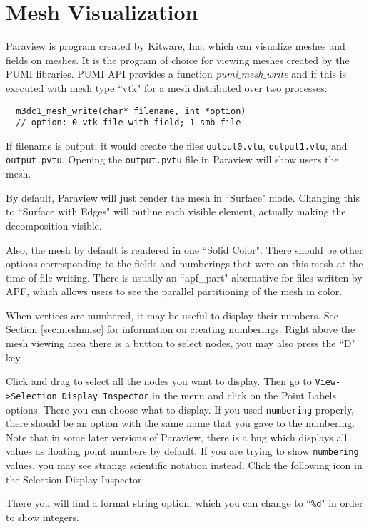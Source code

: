 
\section{Mesh Visualization}
\label{ch:app-paraview}

Paraview is program created by Kitware, Inc. which can visualize meshes
and fields on meshes.
It is the program of choice for viewing meshes created by the PUMI libraries.
PUMI API provides a function \emph{pumi$\_$mesh$\_$write} and if this is executed with mesh type ``vtk" for a mesh distributed over two processes:

\begin{verbatim}
  m3dc1_mesh_write(char* filename, int *option)
  // option: 0 vtk file with field; 1 smb file
\end{verbatim}\vspace{-.5cm}\hspace{1cm}

If filename is output, it would create the files \texttt{output0.vtu}, \texttt{output1.vtu},
and \texttt{output.pvtu}.
Opening the \texttt{output.pvtu} file in Paraview will show users the
mesh.

By default, Paraview will just render the mesh in ``Surface" mode.
Changing this to ``Surface with Edges" will outline each visible element,
actually making the decomposition visible.

Also, the mesh by default is rendered in one ``Solid Color".
There should be other options corresponding to the fields and numberings
that were on this mesh at the time of file writing.
There is usually an ``apf\_part" alternative for files written by APF, which
allows users to see the parallel partitioning of the mesh in color.

When vertices are numbered, it may be useful to display their numbers.
See Section \ref{sec:meshmisc} for information on creating numberings.
Right above the mesh viewing area there is a button to select nodes,
you may also press the ``D" key.

\begin{center}
\end{center}

Click and drag to select all the nodes you want to display.
Then go to \texttt{View->Selection Display Inspector} in the menu and click on
the Point Labels options.
There you can choose what to display.
If you used \texttt{numbering} properly, there should be an option
with the same name that you gave to the numbering.
Note that in some later versions of Paraview, there is a bug which
displays all values as floating point numbers by default.
If you are trying to show \texttt{numbering} values, you may
see strange scientific notation instead.
Click the following icon in the Selection Display Inspector:

\begin{center}
\end{center}

There you will find a format string option, which you can change
to ``\texttt{\%d}" in order to show integers.

